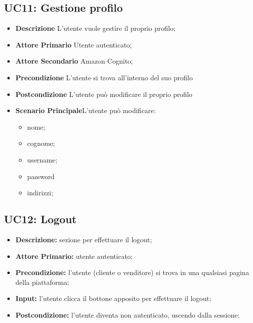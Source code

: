         \subsection{UC11: Gestione profilo}
        \label{sec:UC11}
        \begin{itemize}
            \item \textbf{Descrizione} L'utente vuole gestire il proprio profilo;
            \item \textbf{Attore Primario} Utente autenticato;
            \item \textbf{Attore Secondario} Amazon Cognito;
            \item \textbf{Precondizione} L'utente si trova all'interno del suo profilo
            \item \textbf{Postcondizione} L'utente può modificare il proprio profilo
            \item \textbf{Scenario Principale}L'utente può modificare:
            \begin{itemize}
                \item nome;
                \item cognome;
                \item username;
                \item password
                \item indirizzi;
            \end{itemize}
        \end{itemize}

        
        \subsection{UC12: Logout}
        \begin{itemize}
            \item \textbf{Descrizione:} sezione per effettuare il logout;
            \item \textbf{Attore Primario:} utente autenticato;
            \item \textbf{Precondizione:} l'utente (cliente o venditore) si trova in una qualsiasi pagina della piattaforma;
            \item \textbf{Input:} l'utente clicca il bottone apposito per effettuare il logout;
            \item \textbf{Postcondizione:} l'utente diventa non autenticato, uscendo dalla sessione;
        \end{itemize}


